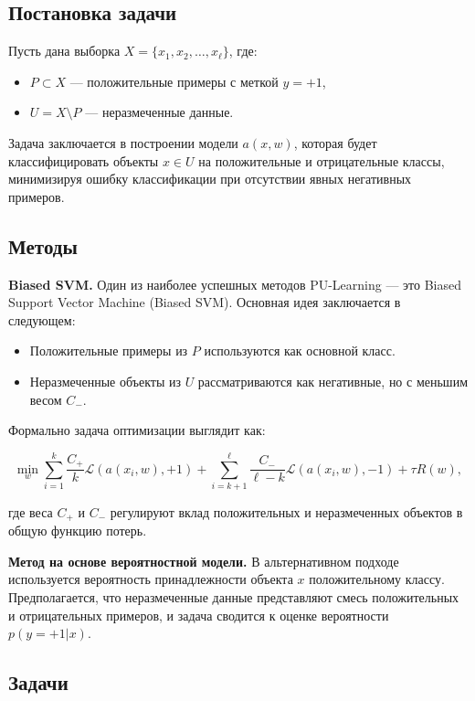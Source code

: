 \subsection{Постановка задачи}

Пусть дана выборка \( X = \{x_1, x_2, \dots, x_\ell\} \), где:
\begin{itemize}
    \item \( P \subset X \) — положительные примеры с меткой \( y = +1 \),
    \item \( U = X \setminus P \) — неразмеченные данные.
\end{itemize}

Задача заключается в построении модели \( a(x, w) \), которая будет классифицировать объекты \( x \in U \) на положительные и отрицательные классы, минимизируя ошибку классификации при отсутствии явных негативных примеров.

\subsection{Методы}

\textbf{Biased SVM.} Один из наиболее успешных методов PU-Learning — это Biased Support Vector Machine (Biased SVM). Основная идея заключается в следующем:
\begin{itemize}
    \item Положительные примеры из \( P \) используются как основной класс.
    \item Неразмеченные объекты из \( U \) рассматриваются как негативные, но с меньшим весом \( C_- \).
\end{itemize}

Формально задача оптимизации выглядит как:

\[
\min_w \sum_{i=1}^k \frac{C_+}{k} \mathcal{L}(a(x_i, w), +1) + \sum_{i=k+1}^\ell \frac{C_-}{\ell - k} \mathcal{L}(a(x_i, w), -1) + \tau R(w),
\]

где веса \( C_+ \) и \( C_- \) регулируют вклад положительных и неразмеченных объектов в общую функцию потерь.

\textbf{Метод на основе вероятностной модели.} В альтернативном подходе используется вероятность принадлежности объекта \( x \) положительному классу. Предполагается, что неразмеченные данные представляют смесь положительных и отрицательных примеров, и задача сводится к оценке вероятности \( p(y = +1 | x) \).

\subsection{Задачи}

